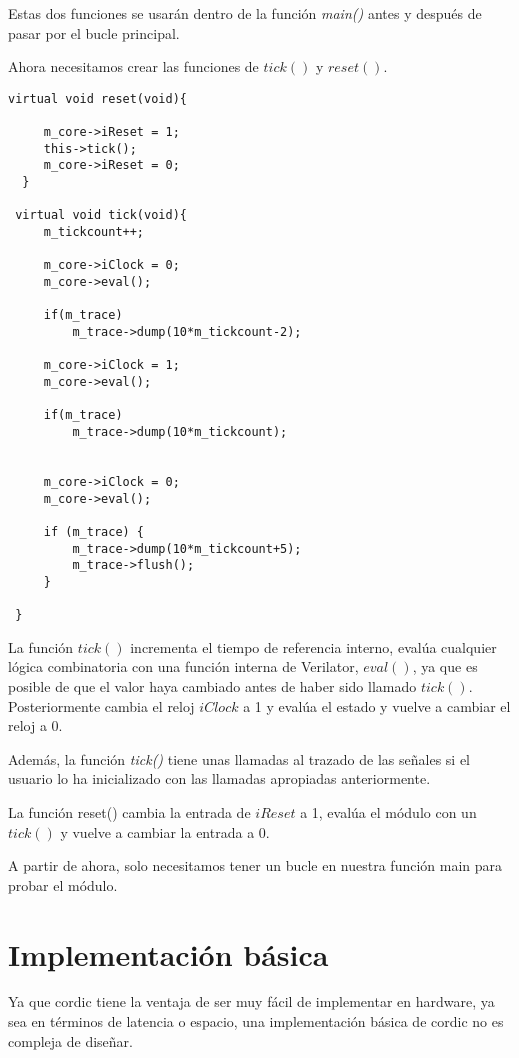 Estas dos funciones se usarán dentro de la función \textit{main()} antes y después de pasar por el bucle principal.

Ahora necesitamos crear las funciones de $tick()$ y $reset()$.

\begin{lstlisting}[caption={Definición de funciones \textit{reset()} y \textit{tick()}}]
  virtual void reset(void){

     m_core->iReset = 1;
     this->tick();
     m_core->iReset = 0;
  }

 virtual void tick(void){
     m_tickcount++;

     m_core->iClock = 0;
     m_core->eval();
     
     if(m_trace) 
         m_trace->dump(10*m_tickcount-2);

     m_core->iClock = 1;
     m_core->eval();
     
     if(m_trace)
         m_trace->dump(10*m_tickcount);
     

     m_core->iClock = 0;
     m_core->eval();
     
     if (m_trace) {
         m_trace->dump(10*m_tickcount+5);
         m_trace->flush();
     }
     
 }
\end{lstlisting}

La función $tick()$ incrementa el tiempo de referencia interno, evalúa cualquier lógica combinatoria con una función interna de Verilator, $eval()$, ya que es posible de que el valor haya cambiado antes de haber sido llamado $tick()$. Posteriormente cambia el reloj $iClock$ a 1 y evalúa el estado y vuelve a cambiar el reloj a 0.

Además, la función \textit{tick()} tiene unas llamadas al trazado de las señales si el usuario lo ha inicializado con las llamadas apropiadas anteriormente.

La función reset() cambia la entrada de $iReset$ a 1, evalúa el módulo con un $tick()$ y vuelve a cambiar la entrada a 0.

A partir de ahora, solo necesitamos tener un bucle en nuestra función main para probar el módulo.

\section{Implementación básica}
Ya que \gls{cordic} tiene la ventaja de ser muy fácil de implementar en hardware, ya sea en términos de latencia o espacio, una implementación básica de \gls{cordic} no es compleja de diseñar.

